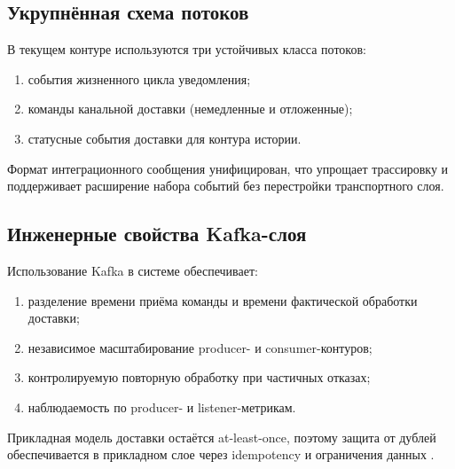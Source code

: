 \subsection{Укрупнённая схема потоков}

В текущем контуре используются три устойчивых класса потоков:
\begin{enumerate}
    \item события жизненного цикла уведомления;
    \item команды канальной доставки (немедленные и отложенные);
    \item статусные события доставки для контура истории.
\end{enumerate}

Формат интеграционного сообщения унифицирован, что упрощает трассировку и
поддерживает расширение набора событий без перестройки транспортного слоя.

\subsection{Инженерные свойства Kafka-слоя}

Использование Kafka в системе обеспечивает:
\begin{enumerate}
    \item разделение времени приёма команды и времени фактической обработки доставки;
    \item независимое масштабирование producer- и consumer-контуров;
    \item контролируемую повторную обработку при частичных отказах;
    \item наблюдаемость по producer- и listener-метрикам.
\end{enumerate}

Прикладная модель доставки остаётся at-least-once, поэтому защита от дублей
обеспечивается в прикладном слое через idempotency и ограничения данных
\cite{kafka_docs,kafka_design_semantics}.
